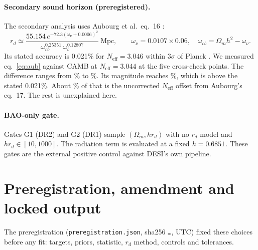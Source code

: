 \documentclass[11pt]{article}
\begin{document}
\paragraph{Secondary sound horizon (preregistered).}
The secondary analysis uses Aubourg et al.\ eq.~16 \cite{aubourg2015}:
\begin{equation}
r_d \simeq \frac{55.154\,e^{-72.3(\omega_\nu+0.0006)^2}}{\omega_{cb}^{0.25351}\,\omega_b^{0.12807}}~\mathrm{Mpc},\qquad
\omega_\nu=0.0107\times0.06,\quad \omega_{cb}=\Omega_m h^2-\omega_\nu .
\label{eq:aub}
\end{equation}
Its stated accuracy is 0.021\% for $N_\mathrm{eff}=3.046$ within
$3\sigma$ of Planck \cite{aubourg2015}. We measured eq.~\eqref{eq:aub}
against CAMB at $N_\mathrm{eff}=3.044$ at the five cross-check points. The
difference ranges from \AubMin\% to \AubMax\%. Its magnitude reaches
\AubMaxAbs\%, which is above the stated 0.021\%. About \NeffOffsetPct\% of that is
the uncorrected $N_\mathrm{eff}$ offset from Aubourg's eq.~17. The rest is
unexplained here.

\paragraph{BAO-only gate.}
Gates G1 (DR2) and G2 (DR1) sample $(\Omega_m, h r_d)$ with no $r_d$ model
and $h r_d\in[10,1000]$. The radiation term is evaluated at a fixed
$h=0.6851$. These gates are the external positive control against DESI's
own pipeline.

\section{Preregistration, amendment and locked output}

The preregistration (\texttt{preregistration.json}, sha256
\texttt{\PreregShaShort\ldots}, \PreregTime{} UTC) fixed these choices
before any fit: targets, priors, statistic, $r_d$ method, controls and
tolerances.
\end{document}
